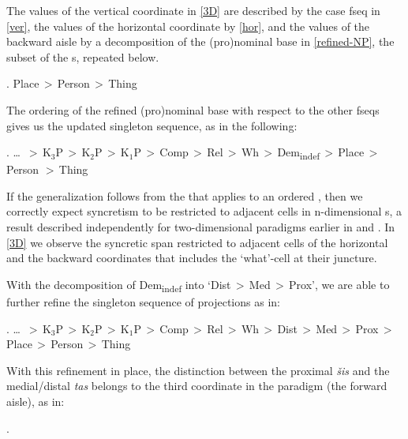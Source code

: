 \begin{center}
\end{center}

\noindent The values of the vertical coordinate in \ref{3D} are described by the case fseq in \ref{ver}, the values of the horizontal coordinate by \ref{hor}, and the values of the backward aisle by a decomposition of the (pro)nominal base in \ref{refined-NP}, the subset of the s, repeated below.

\ex. Place\,$>$\,Person\,$>$\,Thing

The ordering of the refined (pro)nominal base with respect to the other fseqs gives us the updated singleton sequence, as in the following:

\ex. \ldots \ $>$\,K$_{3}$P\,$>$\,K$_{2}$P\,$>$\,K$_{1}$P\,$>$\,Comp\,$>$\,Rel\,$>$\,Wh\,$>$\,Dem\textsubscript{indef}\,$>$\,Place\,$>$\\
Person $>$\,Thing

\noindent
If the  generalization follows from the  that applies to an ordered , then we correctly expect syncretism to be restricted to adjacent cells in n-dimensional s, a result described independently for two-dimensional paradigms earlier in \cite{CahaPantcheva2012} and \cite{GVW2018}. In \ref{3D} we observe the syncretic span restricted to adjacent cells of the horizontal and the backward coordinates that includes the `what'-cell at their juncture.
\par With the decomposition of Dem\textsubscript{indef} into `Dist\,$>$\,Med\,$>$\,Prox', we are able to further refine the singleton sequence of projections as in:

\ex. \ldots \ $>$\,K$_{3}$P\,$>$\,K$_{2}$P\,$>$\,K$_{1}$P\,$>$\,Comp\,$>$\,Rel\,$>$\,Wh\,$>$\,Dist\,$>$\,Med\,$>$\,Prox\,$>$\\ 
Place\,$>$\,Person\,$>$\,Thing

With this refinement in place, the distinction between the  proximal \textit{\v{s}is} and the medial/distal \textit{tas} belongs to the third coordinate in the paradigm (the forward aisle), as in: 

\ex.\label{3D:dem}

